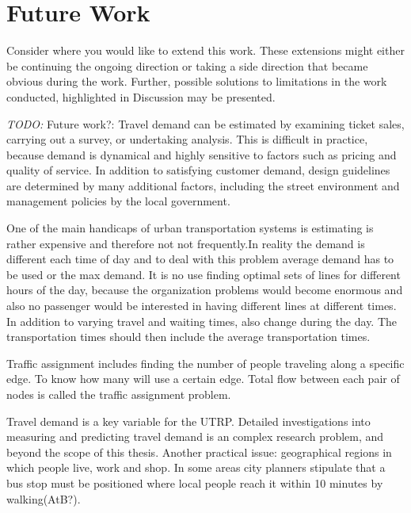 \section{Future Work}

Consider where you would like to extend this work. These extensions might either be continuing the ongoing direction or taking a side direction that became obvious during the work. Further, possible solutions to limitations in the work conducted, highlighted in Discussion may be presented.
\par
\emph{\color{blue} TODO:}
Future work?: Travel demand can be estimated by examining ticket sales, carrying out a survey, or undertaking analysis. This is difficult in practice, because demand is dynamical and highly sensitive to factors such as pricing and quality of service. In addition to satisfying customer demand, design guidelines are determined by many additional factors, including the street environment and management policies by the local government\citep{fan09}.

One of the main handicaps of urban transportation systems is estimating is rather expensive and therefore not not frequently.In reality the demand is different each time of day and to deal with this problem average demand has to be used or the max demand. It is no use finding optimal sets of lines for different hours of the day, because the organization problems would become enormous and also no passenger would be interested in having different lines at different times. In addition to varying travel and waiting times, also change during the day. The transportation times should then include the average transportation times. \citep{mandl79}

Traffic assignment includes finding the number of people traveling along a specific edge. 
To know how many will use a certain edge. Total flow between each pair of nodes is called the traffic assignment problem.

Travel demand is a key variable for the UTRP. Detailed investigations into measuring and predicting travel demand is an complex research problem, and beyond the scope of this thesis. Another practical issue: geographical regions in which people live, work and shop. In some areas city planners stipulate that a bus stop must be positioned where local people reach it within 10 minutes by walking(AtB?). 


